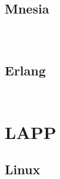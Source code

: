 \begin{lstlisting}[language=bash]

\end{lstlisting}


\section{Mnesia}



\begin{lstlisting}[language=bash]

\end{lstlisting}



\begin{lstlisting}[language=bash]

\end{lstlisting}



\begin{lstlisting}[language=bash]

\end{lstlisting}


\section{Erlang}


\begin{lstlisting}[language=bash]

\end{lstlisting}




\begin{lstlisting}[language=bash]

\end{lstlisting}


\chapter{LAPP}



\section{Linux}


\begin{lstlisting}[language=bash]

\end{lstlisting}




